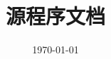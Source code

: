 \documentclass[
class = book,
zihao = -4,
font = noto,
paper = a4paper,
openany
]{easybook}
\begin{document}
	\title{\Name\ \Version \\ 源程序文档}
	\date{\today}
	
	\frontmatter[roman]
	\maketitle
	
	\mainmatter*

	\newpage
	
	
	\backmatter
\end{document}
